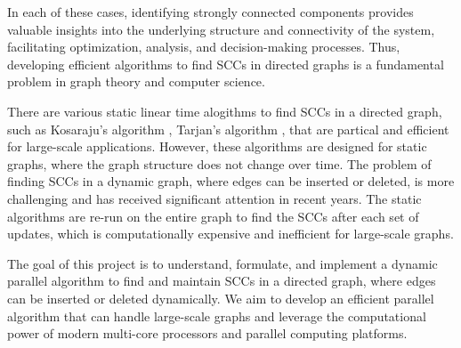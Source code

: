 In each of these cases, identifying strongly connected components provides valuable insights into the underlying structure and connectivity of the system, facilitating optimization, analysis, and decision-making processes.
Thus, developing efficient algorithms to find SCCs in directed graphs is a fundamental problem in graph theory and computer science.

There are various static linear time alogithms to find SCCs in a directed graph, such as Kosaraju's algorithm \cite{Kosaraju}, Tarjan's algorithm \cite{DBLP:journals/corr/abs-2201-07197}, that are partical and efficient for large-scale applications. However, these algorithms are designed for static graphs, where the graph structure does not change over time.
The problem of finding SCCs in a dynamic graph, where edges can be inserted or deleted, is more challenging and has received significant attention in recent years. The static algorithms are re-run on the entire graph to find the SCCs after each set of updates, which is computationally expensive and inefficient for large-scale graphs.

The goal of this project is to understand, formulate, and implement a dynamic parallel algorithm to find and maintain SCCs in a directed graph, where edges can be inserted or deleted dynamically. We aim to develop an efficient parallel algorithm that can handle large-scale graphs and leverage the computational power of modern multi-core processors and parallel computing platforms.
